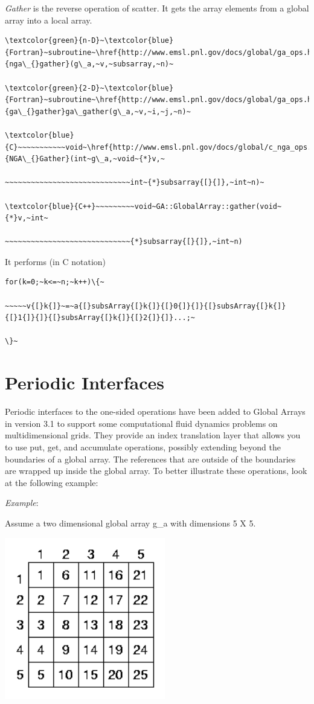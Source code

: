 \emph{Gather} is the reverse operation of scatter. It gets the array
elements from a global array into a local array.
\begin{verbatim}
\textcolor{green}{n-D}~\textcolor{blue}{Fortran}~subroutine~\href{http://www.emsl.pnl.gov/docs/global/ga_ops.html\#ga_gather}{nga\_{}gather}(g\_a,~v,~subsarray,~n)~

\textcolor{green}{2-D}~\textcolor{blue}{Fortran}~subroutine~\href{http://www.emsl.pnl.gov/docs/global/ga_ops.html\#ga_gather}{ga\_{}gather}ga\_gather(g\_a,~v,~i,~j,~n)~

\textcolor{blue}{C}~~~~~~~~~~~void~\href{http://www.emsl.pnl.gov/docs/global/c_nga_ops.html\#ga_gather}{NGA\_{}Gather}(int~g\_a,~void~{*}v,~

~~~~~~~~~~~~~~~~~~~~~~~~~~~~~int~{*}subsarray{[}{]},~int~n)~

\textcolor{blue}{C++}~~~~~~~~~void~GA::GlobalArray::gather(void~{*}v,~int~

~~~~~~~~~~~~~~~~~~~~~~~~~~~~~{*}subsarray{[}{]},~int~n)
\end{verbatim}
It performs (in C notation)
\begin{verbatim}
for(k=0;~k<=~n;~k++)\{~

~~~~~v{[}k{]}~=~a{[}subsArray{[}k{]}{[}0{]}{]}{[}subsArray{[}k{]}{[}1{]}{]}{[}subsArray{[}k{]}{[}2{]}{]}...;~

\}~
\end{verbatim}

\section{Periodic Interfaces }

Periodic interfaces to the one-sided operations have been added to
Global Arrays in version 3.1 to support some computational fluid dynamics
problems on multidimensional grids. They provide an index translation
layer that allows you to use put, get, and accumulate operations,
possibly extending beyond the boundaries of a global array. The references
that are outside of the boundaries are wrapped up inside the global
array. To better illustrate these operations, look at the following
example:

\emph{Example}: 

Assume a two dimensional global array g\_a with dimensions 5 X 5.

\includegraphics[width=7cm]{periodic1}

